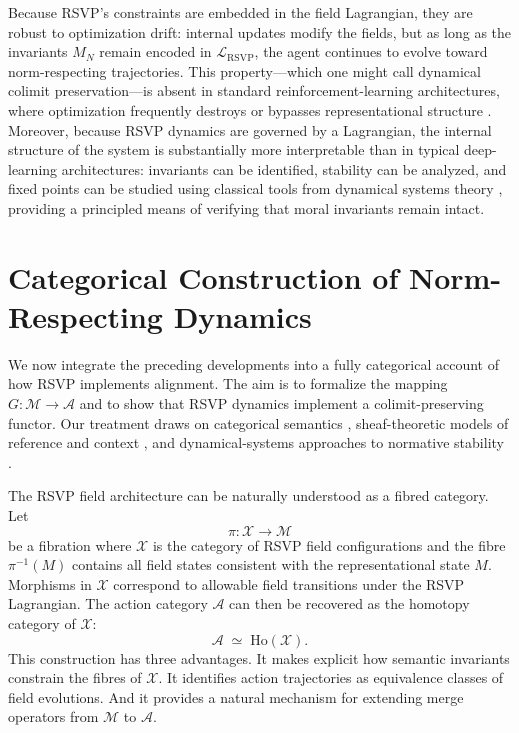 \documentclass[12pt]{article}
\theoremstyle{definition}
\begin{document}
Because RSVP's constraints are embedded in the field Lagrangian, they are robust
to optimization drift: internal updates modify the fields, but as long as the
invariants $M_N$ remain encoded in $\mathcal{L}_{\mathrm{RSVP}}$, the agent
continues to evolve toward norm-respecting trajectories. This property---which
one might call dynamical colimit preservation---is absent in standard
reinforcement-learning architectures, where optimization frequently destroys or
bypasses representational structure \citep{hubinger2019risks}. Moreover, because
RSVP dynamics are governed by a Lagrangian, the internal structure of the system
is substantially more interpretable than in typical deep-learning architectures:
invariants can be identified, stability can be analyzed, and fixed points can be
studied using classical tools from dynamical systems theory \citep{strogatz2018},
providing a principled means of verifying that moral invariants remain intact.

\section{Categorical Construction of Norm-Respecting Dynamics}

We now integrate the preceding developments into a fully categorical account of
how RSVP implements alignment. The aim is to formalize the mapping $G :
\mathcal{M} \to \mathcal{A}$ and to show that RSVP dynamics implement a
colimit-preserving functor. Our treatment draws on categorical semantics
\citep{maclane1998,riehl2017}, sheaf-theoretic models of reference and context
\citep{jacobs2012,spivak2014}, and dynamical-systems approaches to normative
stability \citep{strogatz2018}.

The RSVP field architecture can be naturally understood as a fibred category.
Let
\begin{equation}
  \pi : \mathcal{X} \to \mathcal{M}
\end{equation}
be a fibration where $\mathcal{X}$ is the category of RSVP field
configurations and the fibre $\pi^{-1}(M)$ contains all field states consistent
with the representational state $M$. Morphisms in $\mathcal{X}$ correspond to
allowable field transitions under the RSVP Lagrangian. The action category
$\mathcal{A}$ can then be recovered as the homotopy category of $\mathcal{X}$:
\begin{equation}
  \mathcal{A} \;\simeq\; \mathrm{Ho}(\mathcal{X}).
\end{equation}
This construction has three advantages. It makes explicit how semantic
invariants constrain the fibres of $\mathcal{X}$. It identifies action
trajectories as equivalence classes of field evolutions. And it provides a
natural mechanism for extending merge operators from $\mathcal{M}$ to
$\mathcal{A}$.
\end{document}
